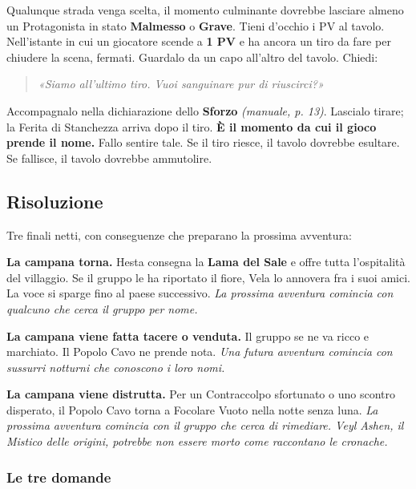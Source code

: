 \documentclass[10pt,a4paper]{article}
\begin{document}
Qualunque strada venga scelta, il momento culminante dovrebbe lasciare almeno un Protagonista in stato \textbf{Malmesso} o \textbf{Grave}. Tieni d'occhio i PV al tavolo. Nell'istante in cui un giocatore scende a \textbf{1 PV} e ha ancora un tiro da fare per chiudere la scena, fermati. Guardalo da un capo all'altro del tavolo. Chiedi:

\begin{quote}
\emph{«Siamo all'ultimo tiro. Vuoi sanguinare pur di riuscirci?»}
\end{quote}

Accompagnalo nella dichiarazione dello \textbf{Sforzo} \emph{(manuale, p. 13)}. Lascialo tirare; la Ferita di Stanchezza arriva dopo il tiro. \textbf{È il momento da cui il gioco prende il nome.} Fallo sentire tale. Se il tiro riesce, il tavolo dovrebbe esultare. Se fallisce, il tavolo dovrebbe ammutolire.

\par\vspace{3pt}

\subsection{Risoluzione}\label{risoluzione}

Tre finali netti, con conseguenze che preparano la prossima avventura:

\textbf{La campana torna.} Hesta consegna la \textbf{Lama del Sale} e offre tutta l'ospitalità del villaggio. Se il gruppo le ha riportato il fiore, Vela lo annovera fra i suoi amici. La voce si sparge fino al paese successivo. \emph{La prossima avventura comincia con qualcuno che cerca il gruppo per nome.}

\textbf{La campana viene fatta tacere o venduta.} Il gruppo se ne va ricco e marchiato. Il Popolo Cavo ne prende nota. \emph{Una futura avventura comincia con sussurri notturni che conoscono i loro nomi.}

\textbf{La campana viene distrutta.} Per un Contraccolpo sfortunato o uno scontro disperato, il Popolo Cavo torna a Focolare Vuoto nella notte senza luna. \emph{La prossima avventura comincia con il gruppo che cerca di rimediare. Veyl Ashen, il Mistico delle origini, potrebbe non essere morto come raccontano le cronache.}

\subsubsection{Le tre domande}\label{le-tre-domande}
\end{document}
